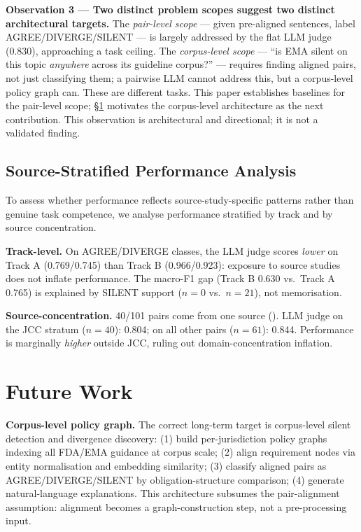 \documentclass[manuscript]{acmart}
\begin{document}
\textbf{Observation 3 --- Two distinct problem scopes suggest two distinct
architectural targets.} The \textit{pair-level scope} --- given pre-aligned
sentences, label AGREE/DIVERGE/SILENT --- is largely addressed by the flat
LLM judge (0.830), approaching a task ceiling. The \textit{corpus-level scope}
--- ``is EMA silent on this topic \textit{anywhere} across its guideline
corpus?'' --- requires finding aligned pairs, not just classifying them; a
pairwise LLM cannot address this, but a corpus-level policy graph can. These
are different tasks. This paper establishes baselines for the pair-level scope;
\S\ref{sec:futurework} motivates the corpus-level architecture as the next
contribution. This observation is architectural and directional; it is not a
validated finding.

\subsection{Source-Stratified Performance Analysis}
\label{sec:source_stratified}

\begin{revblock}
To assess whether performance reflects source-study-specific patterns rather
than genuine task competence, we analyse performance stratified by track and
by source concentration.

\textbf{Track-level.} On AGREE/DIVERGE classes, the LLM judge scores
\textit{lower} on Track A (0.769/0.745) than Track B (0.966/0.923): exposure
to source studies does not inflate performance. The macro-F1 gap (Track B 0.630
vs.\ Track A 0.765) is explained by SILENT support ($n = 0$ vs.\ $n = 21$),
not memorisation.

\textbf{Source-concentration.} 40/101 pairs come from one source
(\citeauthor{uc2025jcc}). LLM judge on the JCC stratum ($n = 40$): 0.804;
on all other pairs ($n = 61$): 0.844. Performance is marginally
\textit{higher} outside JCC, ruling out domain-concentration inflation.
\end{revblock}

\section{Future Work}
\label{sec:futurework}

\textbf{Corpus-level policy graph.}
The correct long-term target is corpus-level silent detection and divergence
discovery: (1) build per-jurisdiction policy graphs indexing all FDA/EMA
guidance at corpus scale; (2) align requirement nodes via entity normalisation
and embedding similarity; (3) classify aligned pairs as AGREE/DIVERGE/SILENT by
obligation-structure comparison; (4) generate natural-language explanations.
This architecture subsumes the pair-alignment assumption: alignment becomes a
graph-construction step, not a pre-processing input.
\end{document}
